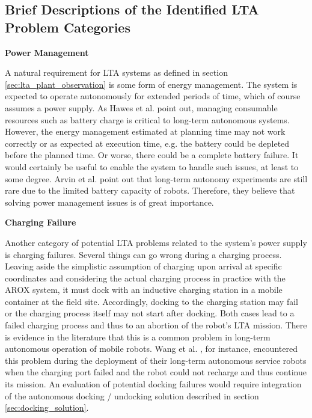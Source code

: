 \documentclass[english, master, utf8]{base/thesis_KBS}
\begin{document}
\subsection{Brief Descriptions of the Identified LTA Problem Categories}

\noindent
\textbf{Power Management}\newline

\noindent
A natural requirement for LTA systems as defined in section \ref{sec:lta_plant_observation} is some form of energy management.
The system is expected to operate autonomously for extended periods of time, which of course assumes a power supply. 
As Hawes et al. \cite{Hawes:2017} point out, managing consumable resources such as battery charge is critical to long-term autonomous systems.
However, the energy management estimated at planning time may not work correctly or as expected at execution time, e.g. the battery could be 
depleted before the planned time. Or worse, there could be a complete battery failure. It would certainly be useful to enable the system to handle such issues, at least to 
some degree. Arvin et al. point out that long-term autonomy experiments are still rare due to the limited battery capacity of robots. \cite{Arvin:2018}
Therefore, they believe that solving power management issues is of great importance.\newline

\noindent
\textbf{Charging Failure}\newline

\noindent
Another category of potential LTA problems related to the system's power supply is charging failures. Several things can go wrong during a charging process. 
Leaving aside the simplistic assumption of charging upon arrival at specific coordinates and considering the actual charging process 
in practice with the AROX system, it must dock with an inductive charging station in a mobile container at the field site.
Accordingly, docking to the charging station may fail or the charging process itself may not start after docking.
Both cases lead to a failed charging process and thus to an abortion of the robot's LTA mission.
There is evidence in the literature that this is a common problem in long-term autonomous operation of mobile robots. Wang et al. \cite{Wang:2018}, for instance, encountered
this problem during the deployment of their long-term autonomous service robots when the charging port failed and the robot could not recharge and thus continue its mission.
An evaluation of potential docking failures would require integration of the autonomous docking / undocking solution described in section \ref{sec:docking_solution}.\newline
\end{document}
